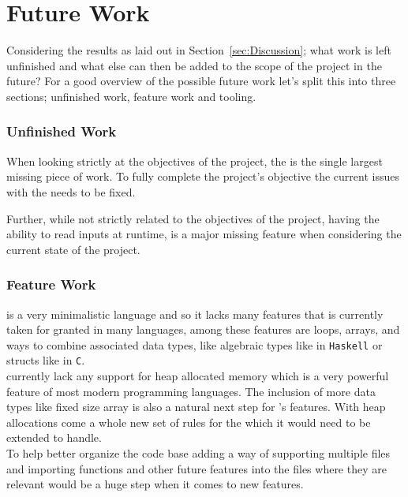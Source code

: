 \section{Future Work}
\label{sec:FutureWork}

Considering the results as laid out in Section~\ref{sec:Discussion}; what work is left
unfinished and what else can then be added to the scope of the project in the future?
For a good overview of the possible future work let's split this into three sections;
unfinished work, feature work and tooling.

\subsubsection{Unfinished Work}
\label{sec:unfinished}

When looking strictly at the objectives of the project, the \borrowChecker{} is the
single largest missing piece of work. To fully complete the project's objective the
current issues with the \borrowChecker{} needs to be fixed. 

Further, while not strictly related to the objectives of the project, having the
ability to read inputs at runtime, is a major missing feature when considering the
current state of the project.

\subsubsection{Feature Work}
\label{sec:feature}

\lang{} is a very minimalistic language and so it lacks many features that is
currently taken for granted in many languages, among these features are loops,
arrays, and ways to combine associated data types, like algebraic types like in
\texttt{Haskell} or structs like in \texttt{C}.\\

\lang{} currently lack any support for heap allocated memory which is a very powerful
feature of most modern programming languages. The inclusion of more data types like
fixed size array is also a natural next step for \lang's features. With heap
allocations come a whole new set of rules for the \borrowChecker{} which it would
need to be extended to handle. \\

To help better organize the code base adding a way of supporting multiple files and
importing functions and other future features into the files where they are relevant
would be a huge step when it comes to new features. \\

